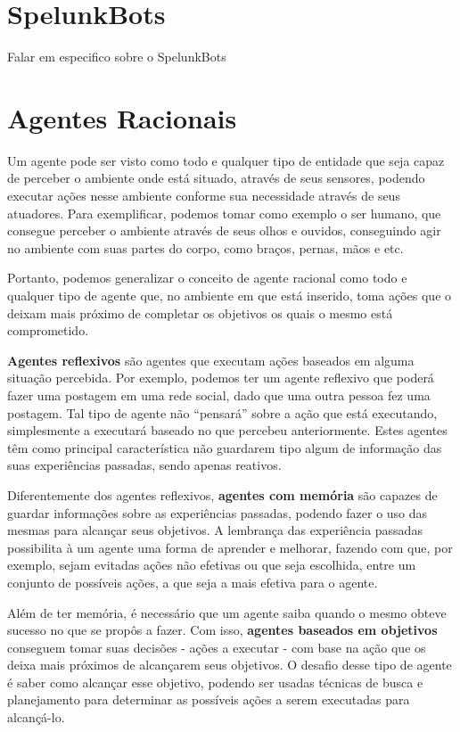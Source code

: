 \section{SpelunkBots}
Falar em especifico sobre o SpelunkBots



\section{Agentes Racionais}
Um agente pode ser visto como todo e qualquer tipo de entidade que seja capaz
de perceber o ambiente onde está situado, através de seus sensores, podendo
executar ações nesse ambiente conforme sua necessidade através de seus
atuadores.\cite{Russell:1995:AIM:193191} Para exemplificar, podemos tomar como
exemplo o ser humano, que consegue perceber o ambiente através de seus olhos e
ouvidos, conseguindo agir no ambiente com suas partes do corpo, como braços,
pernas, mãos e etc.\cite{Russell:1995:AIM:193191}

Portanto, podemos generalizar o conceito de agente racional como todo e
qualquer tipo de agente que, no ambiente em que está inserido, toma ações que o
deixam mais próximo de completar os objetivos os quais o mesmo está
comprometido.

\textbf{Agentes reflexivos} são agentes que executam ações baseados em alguma
situação percebida. Por exemplo, podemos ter um agente reflexivo que poderá
fazer uma postagem em uma rede social, dado que uma outra pessoa fez uma
postagem. Tal tipo de agente não ``pensará'' sobre a ação que está executando,
simplesmente a executará baseado no que percebeu anteriormente. Estes agentes
têm como principal característica não guardarem tipo algum de informação das
suas experiências passadas, sendo apenas reativos.

Diferentemente dos agentes reflexivos, \textbf{agentes com memória} são capazes
de guardar informações sobre as experiências passadas, podendo fazer o uso das
mesmas para alcançar seus objetivos. A lembrança das experiência passadas
possibilita à um agente uma forma de aprender e melhorar, fazendo com que, por
exemplo, sejam evitadas ações não efetivas ou que seja escolhida, entre um
conjunto de possíveis ações, a que seja a mais efetiva para o agente.

Além de ter memória, é necessário que um agente saiba quando o mesmo obteve
sucesso no que se propôs a fazer. Com isso, \textbf{agentes baseados em
objetivos} conseguem tomar suas decisões - ações a executar - com base na ação
que os deixa mais próximos de alcançarem seus objetivos. O desafio desse tipo de
agente é saber como alcançar esse objetivo, podendo ser usadas técnicas de
busca e planejamento para determinar as possíveis ações a serem executadas para
alcançá-lo.

